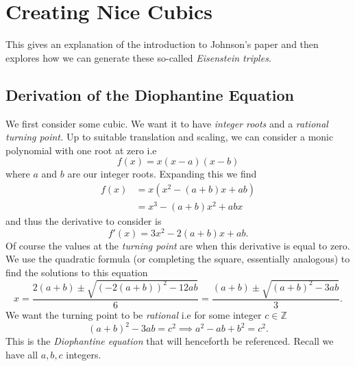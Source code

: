 \documentclass[12pt]{article}
\newcommand{\Z}{\mathbb{Z}}
\begin{document}
\pagebreak 

\section{Creating Nice Cubics}
This gives an explanation of the introduction to Johnson's paper and then explores how we can generate these so-called \textit{Eisenstein triples}.

\subsection{Derivation of the Diophantine Equation}
We first consider some cubic. We want it to have \textit{integer roots} and a \textit{rational turning point.} Up to suitable translation and scaling, we can consider a monic polynomial with one root at zero i.e
\begin{equation*}
    f(x) = x(x-a)(x-b)
\end{equation*}
where $a$ and $b$ are our integer roots. Expanding this we find
\begin{align*}
    f(x) &= x(x^2 - (a + b)x + ab)\\
    &= x^3 - (a+b)x^2 + abx
\end{align*}
and thus the derivative to consider is
\begin{equation*}
    f'(x) = 3x^2 - 2(a+b)x + ab.
\end{equation*}
Of course the values at the \textit{turning point} are when this derivative is equal to zero. We use the quadratic formula (or completing the square, essentially analogous) to find the solutions to this equation
\begin{equation*}
    x = \frac{2(a+b) \pm \sqrt{(-2(a+b))^2-12ab}}{6} = \frac{(a+b) \pm \sqrt{(a+b)^2 - 3ab}}{3}.
\end{equation*}
We want the turning point to be \textit{rational} i.e for some integer $c \in \Z$
\begin{equation}\label{eq:diophantine_eq1}
    (a+b)^2 - 3ab = c^2 \implies a^2 - ab + b^2 = c^2.
\end{equation}
This is the \textit{Diophantine equation} that will henceforth be referenced. Recall we have all $a, b, c$ integers.
\end{document}
